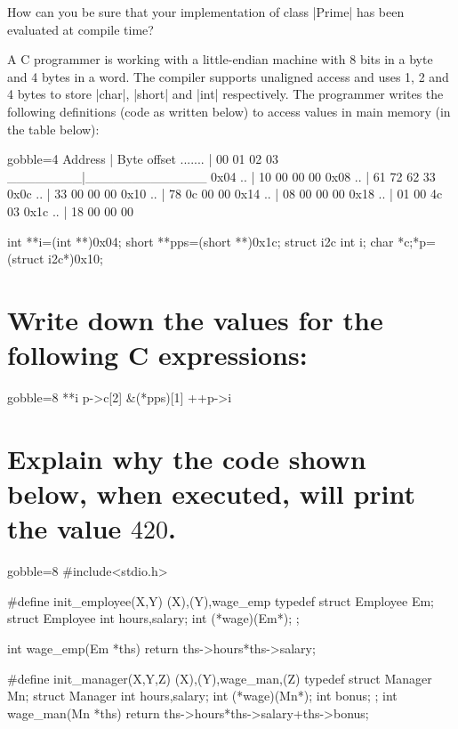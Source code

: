 \documentclass[NewMint]{supervision}
\begin{document}
\begin{questions}
    \question
    How can you be sure that your implementation of class \cppinline|Prime| has been evaluated at compile time?


    A C programmer is working with a little-endian machine with 8 bits in a byte and 4 bytes in a word. The compiler supports unaligned access and uses 1, 2 and 4 bytes to store \cppinline|char|, \cppinline|short| and \cppinline|int| respectively. The programmer writes the following definitions (code as written below) to access values in main memory (in the table below):
    \begin{cppcode*}{gobble=4}
    Address | Byte offset
    ....... | 00 01 02 03
    ________|_____________
    0x04 .. | 10 00 00 00
    0x08 .. | 61 72 62 33
    0x0c .. | 33 00 00 00
    0x10 .. | 78 0c 00 00
    0x14 .. | 08 00 00 00
    0x18 .. | 01 00 4c 03
    0x1c .. | 18 00 00 00

    int **i=(int **)0x04;
    short **pps=(short **)0x1c;
    struct i2c {int i; char *c;}*p=(struct i2c*)0x10;
    \end{cppcode*}

    \begin{parts}
        \part[8]{Write down the values for the following C expressions:}
        \begin{cppcode*}{gobble=8}
        **i
        p->c[2]
        &(*pps)[1]
        ++p->i
        \end{cppcode*}

        \part[4]{Explain why the code shown below, when executed, will print the value $420$.}
        \begin{cppcode*}{gobble=8}
        #include<stdio.h>

        #define init_employee(X,Y) {(X),(Y),wage_emp}
        typedef struct Employee Em;
        struct Employee {
            int hours,salary;
            int (*wage)(Em*);
        };

        int wage_emp(Em *ths) {
            return ths->hours*ths->salary;
        }

        #define init_manager(X,Y,Z) {(X),(Y),wage_man,(Z)}
        typedef struct Manager Mn;
        struct Manager {
            int hours,salary;
            int (*wage)(Mn*);
            int bonus;
        };
        int wage_man(Mn *ths){
            return ths->hours*ths->salary+ths->bonus;
        }


\end{cppcode*}
\end{parts}
\end{questions}
\end{document}
